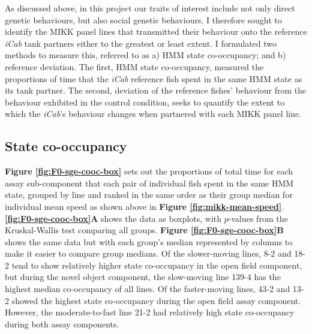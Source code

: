 \documentclass[
]{book}
\begin{document}
As discussed above, in this project our traits of interest include not only direct genetic behaviours, but also social genetic behaviours. I therefore sought to identify the MIKK panel lines that transmitted their behaviour onto the reference \emph{\textcolor{iCab_424B4D}{iCab}} tank partners either to the greatest or least extent. I formulated two methods to measure this, referred to as a) HMM state co-occupancy; and b) reference deviation. The first, HMM state co-occupancy, measured the proportions of time that the \emph{\textcolor{iCab_424B4D}{iCab}} reference fish spent in the same HMM state as its tank partner. The second, deviation of the reference fishes' behaviour from the behaviour exhibited in the control condition, seeks to quantify the extent to which the \emph{\textcolor{iCab_424B4D}{iCab}}'s behaviour changes when partnered with each MIKK panel line.

\hypertarget{state-co-occupancy}{%
\subsection{State co-occupancy}\label{state-co-occupancy}}

\textbf{Figure \ref{fig:F0-sge-cooc-box}} sets out the proportions of total time for each assay sub-component that each pair of individual fish spent in the same HMM state, grouped by line and ranked in the same order as their group median for individual mean speed as shown above in \textbf{Figure \ref{fig:mikk-mean-speed}}. \textbf{\ref{fig:F0-sge-cooc-box}A} shows the data as boxplots, with \(p\)-values from the Kruskal-Wallis test comparing all groups. \textbf{Figure \ref{fig:F0-sge-cooc-box}B} shows the same data but with each group's median represented by columns to make it easier to compare group medians. Of the slower-moving lines, \textcolor{8-2_FF699C}{8-2} and \textcolor{18-2_FF66A6}{18-2} tend to show relatively higher state co-occupancy in the open field component, but during the novel object component, the slow-moving line \textcolor{139-4_FF61CC}{139-4} has the highest median co-occupancy of all lines. Of the faster-moving lines, \textcolor{43-2_F17D50}{43-2} and \textcolor{13-2_F57A5F}{13-2} showed the highest state co-occupancy during the open field assay component. However, the moderate-to-fast line \textcolor{21-2_49B500}{21-2} had relatively high state co-occupancy during both assay components.
\end{document}
